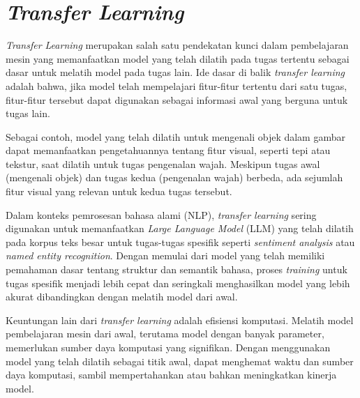 \section{\textit{Transfer Learning}}

\textit{Transfer Learning} merupakan salah satu pendekatan kunci dalam pembelajaran mesin yang memanfaatkan model yang telah dilatih pada tugas tertentu sebagai dasar untuk melatih model pada tugas lain. Ide dasar di balik \textit{transfer learning} adalah bahwa, jika model telah mempelajari fitur-fitur tertentu dari satu tugas, fitur-fitur tersebut dapat digunakan sebagai informasi awal yang berguna untuk tugas lain.

Sebagai contoh, model yang telah dilatih untuk mengenali objek dalam gambar dapat memanfaatkan pengetahuannya tentang fitur visual, seperti tepi atau tekstur, saat dilatih untuk tugas pengenalan wajah. Meskipun tugas awal (mengenali objek) dan tugas kedua (pengenalan wajah) berbeda, ada sejumlah fitur visual yang relevan untuk kedua tugas tersebut.

Dalam konteks pemrosesan bahasa alami (NLP), \textit{transfer learning} sering digunakan untuk memanfaatkan \textit{Large Language Model} (LLM) yang telah dilatih pada korpus teks besar untuk tugas-tugas spesifik seperti \textit{sentiment analysis} atau \textit{named entity recognition}. Dengan memulai dari model yang telah memiliki pemahaman dasar tentang struktur dan semantik bahasa, proses \textit{training} untuk tugas spesifik menjadi lebih cepat dan seringkali menghasilkan model yang lebih akurat dibandingkan dengan melatih model dari awal.

Keuntungan lain dari \textit{transfer learning} adalah efisiensi komputasi. Melatih model pembelajaran mesin dari awal, terutama model dengan banyak parameter, memerlukan sumber daya komputasi yang signifikan. Dengan menggunakan model yang telah dilatih sebagai titik awal, dapat menghemat waktu dan sumber daya komputasi, sambil mempertahankan atau bahkan meningkatkan kinerja model.

